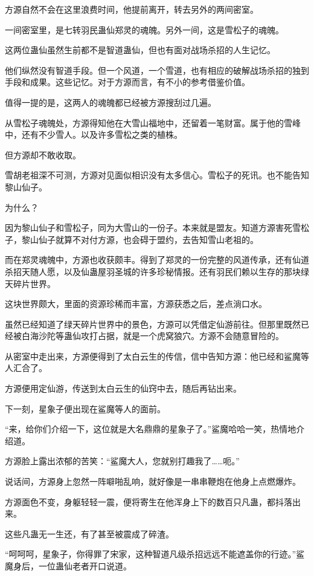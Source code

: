 \begin{this_body}
方源自然不会在这里浪费时间，他提前离开，转去另外的两间密室。

一间密室里，是七转羽民蛊仙郑灵的魂魄。另外一间，这是雪松子的魂魄。

这两位蛊仙虽然生前都不是智道蛊仙，但也有面对战场杀招的人生记忆。

他们纵然没有智道手段。但一个风道，一个雪道，也有相应的破解战场杀招的独到手段和成果。这些记忆。对于方源而言，有不小的参考借鉴价值。

值得一提的是，这两人的魂魄都已经被方源搜刮过几遍。

从雪松子魂魄处，方源得知他在大雪山福地中，还留着一笔财富。属于他的雪峰中，还有不少雪人。以及许多雪松之类的植株。

但方源却不敢收取。

雪胡老祖深不可测，方源对见面似相识没有太多信心。雪松子的死讯。也不能告知黎山仙子。

为什么？

因为黎山仙子和雪松子，同为大雪山的一份子。本来就是盟友。知道方源害死雪松子，黎山仙子就算不对付方源，也会碍于盟约，去告知雪山老祖的。

而在郑灵魂魄中，方源也收获颇丰。得到了郑灵的一份完整的风道传承，还有仙道杀招天随人愿，以及仙蛊屋羽圣城的许多珍秘情报。还有羽民们赖以生存的那块绿天碎片世界。

这块世界颇大，里面的资源珍稀而丰富，方源获悉之后，差点淌口水。

虽然已经知道了绿天碎片世界中的景色，方源可以凭借定仙游前往。但那里既然已经被白海沙陀等蛊仙攻打占据，就是一个虎窝狼穴。方源不会随意冒险的。

从密室中走出来，方源便得到了太白云生的传信，信中告知方源：他已经和鲨魔等人汇合了。

方源便用定仙游，传送到太白云生的仙窍中去，随后再钻出来。

下一刻，星象子便出现在鲨魔等人的面前。

“来，给你们介绍一下，这位就是大名鼎鼎的星象子了。”鲨魔哈哈一笑，热情地介绍道。

方源脸上露出浓郁的苦笑：“鲨魔大人，您就别打趣我了……呃。”

说话间，方源身上忽然一阵噼啪乱响，就好像是一串串鞭炮在他身上点燃爆炸。

方源面色不变，身躯轻轻一震，便将寄生在他浑身上下的数百只凡蛊，都抖落出来。

这些凡蛊无一生还，有了甚至被震成了碎渣。

“呵呵呵，星象子，你得罪了宋家，这种智道凡级杀招远远不能遮盖你的行迹。”鲨魔身后，一位蛊仙老者开口说道。


\end{this_body}
